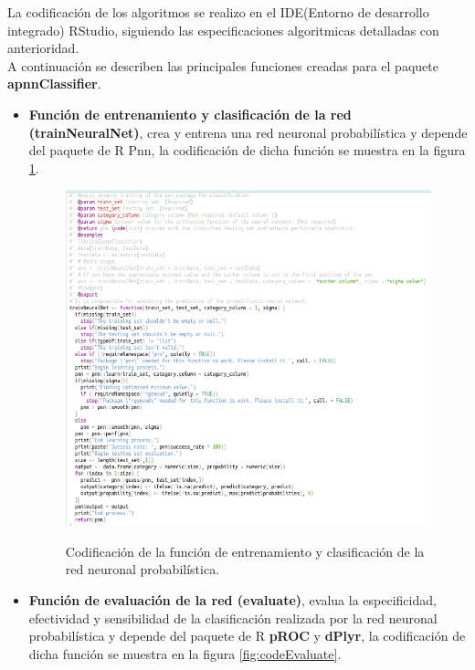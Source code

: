 	La codificación de los algoritmos se realizo en el IDE(Entorno de desarrollo integrado) RStudio, siguiendo las especificaciones algoritmicas detalladas con anterioridad.\\

	A continuación se describen las principales funciones creadas para el paquete \textbf{apnnClassifier}.\\
	
\begin{itemize}
\item \textbf{Función de entrenamiento y clasificación de la red \textbf{(trainNeuralNet)}}, crea y entrena una red neuronal probabilística y depende del paquete de R Pnn, la codificación de dicha función se muestra en la figura \ref{fig:codeTrainNeuralNet}.

\begin{figure}[h!]
	\caption{Codificación de la función de entrenamiento y clasificación de la red neuronal probabilística.}
	\centering
	\includegraphics[scale=0.8]{codeTrainNeuralNet.png}
	\label{fig:codeTrainNeuralNet}
\end{figure}

\item \textbf{Función de evaluación de la red \textbf{(evaluate)}}, evalua la especificidad, efectividad y sensibilidad de la clasificación realizada por la red neuronal probabilística y depende del paquete de R \textbf{pROC} y \textbf{dPlyr}, la codificación de dicha función se muestra en la figura \ref{fig:codeEvaluate}.


\end{itemize}
